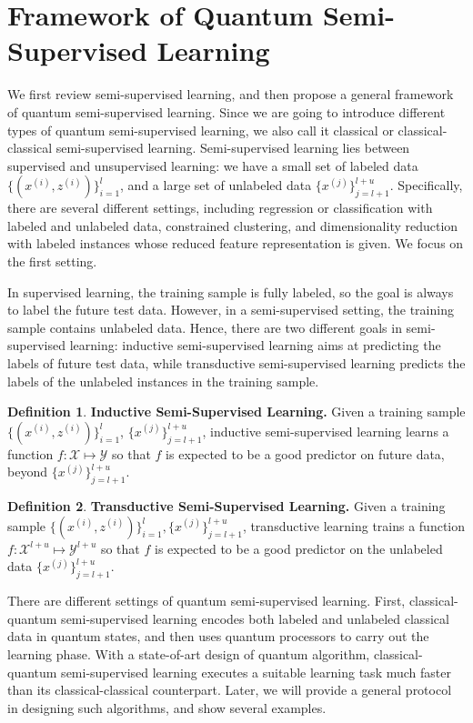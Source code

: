\documentclass[11pt]{article}
\theoremstyle{definition}
\newtheorem{definition}{Definition}[section]
\def\zsi{z^{(i)}}
\def\xsi{x^{(i)}}
\def\xsj{x^{(j)}}
\begin{document}
\section{Framework of Quantum Semi-Supervised Learning}
\label{framework}

We first review semi-supervised learning, and then propose a general framework of quantum semi-supervised learning. Since we are going to introduce different types of quantum semi-supervised learning, we also call it classical or classical-classical semi-supervised learning. Semi-supervised learning lies between supervised and unsupervised learning: we have a small set of labeled data $\{ (\xsi, \zsi) \}_{i = 1}^l$, and a large set of unlabeled data $\{ \xsj \}_{j = l+1}^{l + u}$. 
Specifically, there are several different settings, including regression or classification with labeled and unlabeled data, constrained clustering, and dimensionality reduction with labeled instances whose reduced feature representation is given. We focus on the first setting. 

In supervised learning, the training sample is fully labeled, so the goal is always to label the future test data. However, in a semi-supervised setting, the training sample contains unlabeled data. Hence, there are two different goals in semi-supervised learning: inductive semi-supervised learning aims at predicting the labels of future test data, while transductive semi-supervised learning predicts the labels of the unlabeled instances in the training sample.

\begin{definition}
\textbf{Inductive Semi-Supervised Learning.}
Given a training sample 
$\{ (\xsi, \zsi) \}_{i = 1}^l$, $\{ \xsj \}_{j = l+1}^{l + u}$, inductive semi-supervised learning learns a function $f: \mathcal{X} \mapsto \mathcal{Y}$ so that $f$ is expected to be a good predictor on future data, beyond $\{ \xsj \}_{j = l+1}^{l + u}$.
\end{definition}

\begin{definition}
\textbf{Transductive Semi-Supervised Learning.}
Given a training sample $\{ (\xsi, \zsi) \}_{i = 1}^l, \{ \xsj \}_{j = l+1}^{l + u}$, transductive learning trains a function $f: \mathcal{X}^{l+u} \mapsto \mathcal{Y}^{l+u}$ so that $f$ is expected to be a good predictor on the unlabeled data $\{ \xsj \}_{j = l+1}^{l + u}$.
\end{definition}

There are different settings of quantum semi-supervised learning. First, classical-quantum semi-supervised learning encodes both labeled and unlabeled classical data in quantum states, and then uses quantum processors to carry out the learning phase. With a state-of-art design of quantum algorithm, classical-quantum semi-supervised learning executes a suitable learning task much faster than its classical-classical counterpart. 
Later, we will provide a general protocol in designing such algorithms, and show several examples. 
\end{document}
